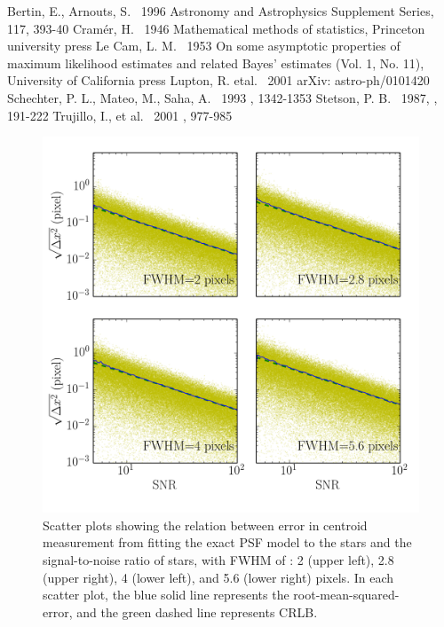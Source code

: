 \documentclass[12pt, preprint]{aastex}
\begin{document}
\begin{thebibliography}{70}

 Bertin, E., Arnouts, S. \ 1996  Astronomy and Astrophysics Supplement Series, 117, 393-40
 Cram\'{e}r, H. \ 1946 Mathematical methods of statistics, Princeton university press
 Le Cam, L. M. \ 1953 On some asymptotic properties of maximum likelihood estimates and related Bayes' estimates (Vol. 1, No. 11), University of California press
 Lupton, R. etal. \ 2001  arXiv: astro-ph/0101420
 Schechter, P. L., Mateo, M., Saha, A. \ 1993 \pasp, 1342-1353
 Stetson, P. B. \ 1987, \pasp, 191-222
 Trujillo, I., et al. \ 2001 \mnras, 977-985

\end{thebibliography}

\clearpage

\begin{figure}[!htb]
  \includegraphics[width=\linewidth]{snr_psffitting.png}
\endminipage
\caption{Scatter plots showing the relation between error in centroid measurement
from fitting the exact PSF model to the stars and the signal-to-noise ratio of stars,
with FWHM of : 2 (upper left), 2.8 (upper right), 4 (lower left), and 5.6 (lower right)
pixels. In each scatter plot, the blue solid line represents the root-mean-squared-error, and the green dashed line represents CRLB.}\label{1}
\end{figure}
\end{document}
